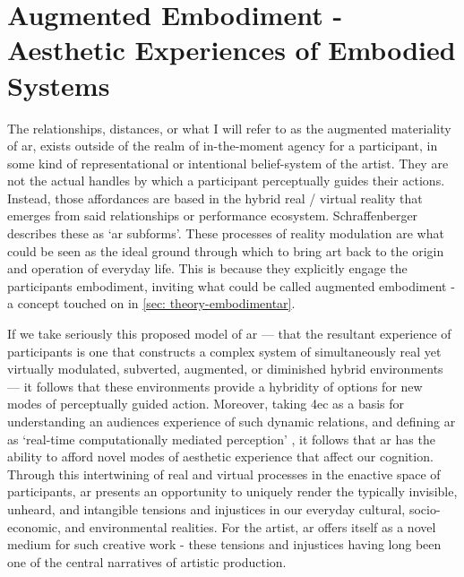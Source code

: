 \section[Augmented Embodiment]{Augmented Embodiment - Aesthetic Experiences of Embodied Systems}\label{sec: discussion-medium-embodiment}
The relationships, distances, or what I will refer to as the augmented materiality of \gls{ar}, exists outside of the realm of in-the-moment agency for a participant, in some kind of representational or intentional belief-system of the artist. They are not the actual handles by which a participant perceptually guides their actions. Instead, those affordances are based in the hybrid real / virtual reality that emerges from said relationships or performance ecosystem. Schraffenberger describes these as `\gls{ar} subforms'. These processes of reality modulation are what could be seen as the ideal ground through which to bring art back to the origin and operation of everyday life. This is because they explicitly engage the participants embodiment, inviting what could be called augmented embodiment - a concept touched on in \autoref{sec: theory-embodimentar}.

If we take seriously this proposed model of \gls{ar} — that the resultant experience of participants is one that constructs a complex system of simultaneously real yet virtually modulated, subverted, augmented, or diminished hybrid environments — it follows that these environments provide a hybridity of options for new modes of perceptually guided action. Moreover, taking \gls{4ec} as a basis for understanding an audiences experience of such dynamic relations, and defining \gls{ar} as `real-time computationally mediated perception' \citep[]{chevalier2020}, it follows that \gls{ar} has the ability to afford novel modes of aesthetic experience that affect our cognition. Through this intertwining of real and virtual processes in the enactive space of participants, \gls{ar} presents an opportunity to uniquely render the typically invisible, unheard, and intangible tensions and injustices in our everyday cultural, socio-economic, and environmental realities. For the artist, \gls{ar} offers itself as a novel medium for such creative work - these tensions and injustices having long been one of the central narratives of artistic production.

